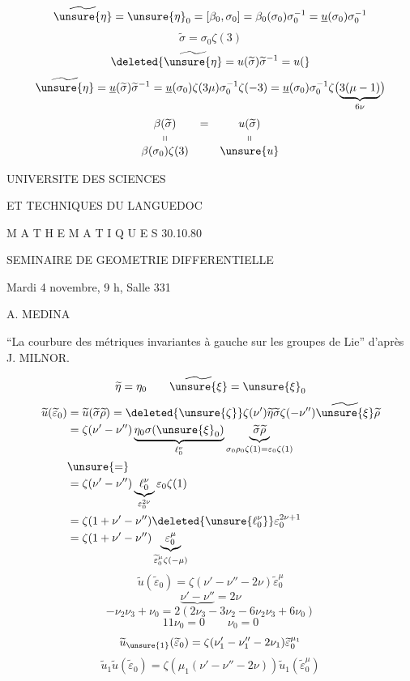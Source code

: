 
\[
\widetilde{\unsure{\eta}}=\unsure{\eta}_0=[\beta_0,\sigma_0]
=\beta_0(\sigma_0)\sigma_0^{-1}
=\underline u(\sigma_0)\sigma_0^{-1}
\]
\[
\widetilde\sigma=\sigma_0\zeta(3)
\]
\[
\deleted{\widetilde{\unsure{\eta}}=u(\widetilde\sigma)\widetilde\sigma^{-1}=u(}
\]
\[
\widetilde{\unsure{\eta}}
=\underline u(\widetilde\sigma)\widetilde\sigma^{-1}
=\underline u(\sigma_0)\zeta(3\mu)\sigma_0^{-1}\zeta(-3)
=\underline u(\sigma_0)\sigma_0^{-1}
  \zeta\bigl(\underbrace{3(\mu-1)}_{6\nu}\bigr)
\]
\[
\begin{array}{ccc}
\beta(\widetilde\sigma)&=&u(\widetilde\sigma)\\
\shortparallel&&\shortparallel\\
\beta(\sigma_0)\zeta(3)&&\unsure{u}
\end{array}
\]

UNIVERSITE DES SCIENCES

ET TECHNIQUES DU LANGUEDOC

M A T H E M A T I Q U E S \hfill 30.10.80

\begin{center}
SEMINAIRE DE GEOMETRIE DIFFERENTIELLE

Mardi 4 novembre, 9 h, Salle 331

A. MEDINA
\end{center}

``La courbure des métriques invariantes à gauche sur les groupes de Lie'' d'après J. MILNOR.

\[
\widetilde\eta=\eta_0\qquad \widetilde{\unsure{\xi}}=\unsure{\xi}_0
\]
\[
\begin{aligned}
\widetilde u(\widetilde\varepsilon_0)
 &=\widetilde u(\widetilde\sigma\widetilde\rho)
 =\deleted{\unsure{\zeta}}\zeta(\nu')\widetilde\eta\widetilde\sigma
   \zeta(-\nu'')\widetilde{\unsure{\xi}}\widetilde\rho\\
 &=\zeta(\nu'-\nu'')
   \underbrace{\eta_0\sigma(\unsure{\xi}_0)}_{\ell_0^\nu}
   \underbrace{\widetilde\sigma\widetilde\rho}
     _{\sigma_0\rho_0\zeta(1)=\varepsilon_0\zeta(1)}\\
 &\unsure{=}\\
 &=\zeta(\nu'-\nu'')
    \underbrace{\ell_0^\nu}_{\varepsilon_0^{2\nu}}
      \varepsilon_0\zeta(1)\\
 &=\zeta(1+\nu'-\nu'')\deleted{\unsure{\ell_0^\nu}}
       \varepsilon_0^{2\nu+1}\\
 &=\zeta(1+\nu'-\nu'')
   \underbrace{\varepsilon_0^\mu}_{\widetilde\varepsilon_0^\mu\zeta(-\mu)}
\end{aligned}
\]
\[
\boxed{\widetilde u(\widetilde\varepsilon_0)
 =\zeta(\nu'-\nu''-2\nu)\widetilde\varepsilon_0^\mu}
\]
\[
\underbrace{\nu'-\nu''}=2\nu
\]
\[
-\nu_2\nu_3+\nu_0=2(2\nu_3-3\nu_2-6\nu_2\nu_3+6\nu_0)
\]
\[
11\nu_0=0\qquad \nu_0=0
\]
\[
\widetilde u_{\unsure{1}}(\widetilde\varepsilon_0)
 =\zeta(\nu'_1-\nu''_1-2\nu_1)\widetilde\varepsilon_0^{\mu_1}
\]
\[
\widetilde u_1\widetilde u(\widetilde\varepsilon_0)
 =\zeta(\mu_1(\nu'-\nu''-2\nu))
    \widetilde u_1(\widetilde\varepsilon_0^\mu)
\]

